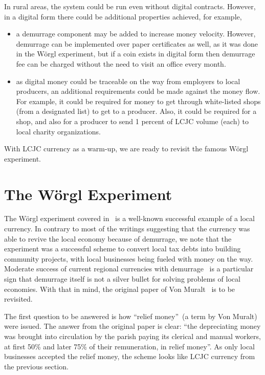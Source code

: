 \documentclass[]{llncs}   %
\begin{document}
In rural areas, the system could be run even without digital contracts. However, in a digital form there could be
additional properties achieved, for example,
    \begin{itemize}
        \item{} a demurrage component may be added to increase money velocity. However, demurrage can be implemented over paper 
        certificates as well, as it was done in the W\"{o}rgl experiment, but if a coin exists in digital form 
         then demurrage fee can be charged without the need to visit an office every month.
        \item{} as digital money could be traceable on the way from employers to local producers, an additional
        requirements could be made against the money flow. For example, it could be required for money to get through
        white-listed shops (from a designated list) to get to a producer. Also, it could be required for a shop, and also for a
        producer to send 1 percent of LCJC volume (each) to local charity organizations.
    \end{itemize}


With LCJC currency as a warm-up, we are ready to revisit the famous W\"{o}rgl experiment.

\section{The W\"{o}rgl Experiment}
\label{sec-worgl}

The W\"{o}rgl experiment covered in~\cite{muralt1934woergl} is a well-known successful example of a local currency. In
contrary to most of the writings suggesting that the currency was able to revive the local economy because of demurrage, we note that the experiment was a successful scheme to convert local tax debts into building community projects, with
 local businesses being fueled with money on the way. Moderate success of current regional currencies with demurrage~\cite{thiel2011complementary} is a particular sign that demurrage itself is not a silver bullet for solving problems of local economies.
 With that in mind, the original paper of Von Muralt~\cite{muralt1934woergl} is to be revisited. 

 The first question to be answered is how ``relief money''~(a term by Von Muralt) were issued. The answer from the original paper is clear: ``the depreciating money was brought into circulation by the parish paying its clerical and manual workers, at first 50\% and later 75\% of their remuneration, in relief money''. As only local businesses accepted the relief money, the scheme looks like LCJC 
 currency from the previous section. 
\end{document}
